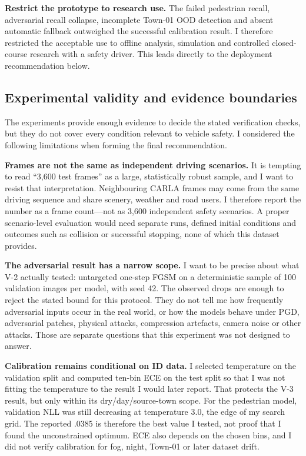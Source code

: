 \documentclass[nologo,a4paper,12pt]{article}
\begin{document}
\textbf{Restrict the prototype to research use.} The failed pedestrian recall, adversarial recall
collapse, incomplete Town-01 OOD detection and absent automatic fallback outweighed the successful
calibration result. I therefore restricted the acceptable use to offline analysis, simulation and
controlled closed-course research with a safety driver. This leads directly to the deployment
recommendation below.

\clearpage
\subsection{Experimental validity and evidence boundaries}

The experiments provide enough evidence to decide the stated verification checks, but they do not
cover every condition relevant to vehicle safety. I considered the following limitations when
forming the final recommendation.

\textbf{Frames are not the same as independent driving scenarios.} It is tempting to read ``3,600
test frames'' as a large, statistically robust sample, and I want to resist that interpretation.
Neighbouring CARLA frames may come from the same driving sequence and share scenery, weather and
road users. I therefore report the number as a frame count---not as 3,600 independent safety
scenarios. A proper scenario-level evaluation would need separate runs, defined initial conditions
and outcomes such as collision or successful stopping, none of which this dataset provides.

\textbf{The adversarial result has a narrow scope.} I want to be precise about what V-2 actually
tested: untargeted one-step FGSM on a deterministic sample of 100 validation images per model, with
seed 42. The observed drops are enough to reject the stated bound for this protocol. They do not
tell me how frequently adversarial inputs occur in the real world, or how the models behave under
PGD, adversarial patches, physical attacks, compression artefacts, camera noise or other attacks.
Those are separate questions that this experiment was not designed to answer.

\textbf{Calibration remains conditional on ID data.} I selected temperature on the validation split
and computed ten-bin ECE on the test split so that I was not fitting the temperature to the result I
would later report. That protects the V-3 result, but only within its dry/day/source-town scope. For
the pedestrian model, validation NLL was still decreasing at temperature 3.0, the edge of my search
grid. The reported .0385 is therefore the best value I tested, not proof that I found the unconstrained
optimum. ECE also depends on the chosen bins, and I did not verify calibration for fog, night,
Town-01 or later dataset drift.
\end{document}
